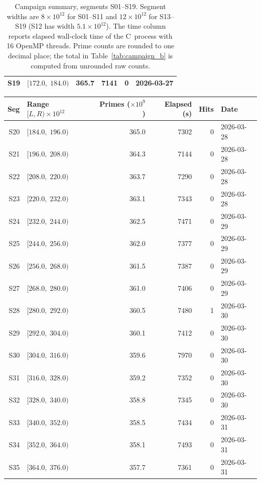 \documentclass[11pt]{article}
\theoremstyle{definition}
\theoremstyle{remark}
\begin{document}
\begin{table}[ht]
\begin{center}
\begin{tabular}{rlrrrl}
S19 & $[172.0,\;184.0)$ & 365.7 & 7141 & 0 & 2026-03-27 \\
\bottomrule
\end{tabular}
\caption{Campaign summary, segments S01--S19.
Segment widths are $8 \times 10^{12}$ for S01--S11
and $12 \times 10^{12}$ for S13--S19
(S12 has width $5.1 \times 10^{12}$).
The time column reports elapsed wall-clock time of the C~process
with 16 OpenMP threads.
Prime counts are rounded to one decimal place; the total in
Table~\ref{tab:campaign_b} is computed from unrounded raw counts.}
\label{tab:campaign_a}
\end{center}
\end{table}

\begin{table}[ht]
\begin{center}
\small
\begin{tabular}{rlrrrl}
\toprule
Seg & Range $[L, R) \times 10^{12}$ & Primes ($\times 10^9$)
    & Elapsed (s) & Hits & Date \\
\midrule
S20 & $[184.0,\;196.0)$ & 365.0 & 7302 & 0 & 2026-03-28 \\
S21 & $[196.0,\;208.0)$ & 364.3 & 7144 & 0 & 2026-03-28 \\
S22 & $[208.0,\;220.0)$ & 363.7 & 7290 & 0 & 2026-03-28 \\
S23 & $[220.0,\;232.0)$ & 363.1 & 7343 & 0 & 2026-03-28 \\
S24 & $[232.0,\;244.0)$ & 362.5 & 7471 & 0 & 2026-03-29 \\
S25 & $[244.0,\;256.0)$ & 362.0 & 7377 & 0 & 2026-03-29 \\
S26 & $[256.0,\;268.0)$ & 361.5 & 7387 & 0 & 2026-03-29 \\
S27 & $[268.0,\;280.0)$ & 361.0 & 7406 & 0 & 2026-03-29 \\
S28 & $[280.0,\;292.0)$ & 360.5 & 7480 & 1 & 2026-03-30 \\
S29 & $[292.0,\;304.0)$ & 360.1 & 7412 & 0 & 2026-03-30 \\
S30 & $[304.0,\;316.0)$ & 359.6 & 7970 & 0 & 2026-03-30 \\
S31 & $[316.0,\;328.0)$ & 359.2 & 7352 & 0 & 2026-03-30 \\
S32 & $[328.0,\;340.0)$ & 358.8 & 7345 & 0 & 2026-03-30 \\
S33 & $[340.0,\;352.0)$ & 358.5 & 7434 & 0 & 2026-03-31 \\
S34 & $[352.0,\;364.0)$ & 358.1 & 7493 & 0 & 2026-03-31 \\
S35 & $[364.0,\;376.0)$ & 357.7 & 7361 & 0 & 2026-03-31 \\

\end{tabular}
\end{center}
\end{table}
\end{document}
